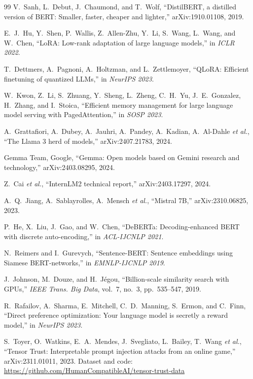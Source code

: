 \documentclass[conference]{IEEEtran}
\begin{document}
\begin{thebibliography}{99}
 V.~Sanh, L.~Debut, J.~Chaumond, and T.~Wolf, ``DistilBERT, a distilled version of BERT: Smaller, faster, cheaper and lighter,'' arXiv:1910.01108, 2019.

 E.~J.~Hu, Y.~Shen, P.~Wallis, Z.~Allen-Zhu, Y.~Li, S.~Wang, L.~Wang, and W.~Chen, ``LoRA: Low-rank adaptation of large language models,'' in \textit{ICLR 2022}.

 T.~Dettmers, A.~Pagnoni, A.~Holtzman, and L.~Zettlemoyer, ``QLoRA: Efficient finetuning of quantized LLMs,'' in \textit{NeurIPS 2023}.

 W.~Kwon, Z.~Li, S.~Zhuang, Y.~Sheng, L.~Zheng, C.~H.~Yu, J.~E.~Gonzalez, H.~Zhang, and I.~Stoica, ``Efficient memory management for large language model serving with PagedAttention,'' in \textit{SOSP 2023}.

 A.~Grattafiori, A.~Dubey, A.~Jauhri, A.~Pandey, A.~Kadian, A.~Al-Dahle \textit{et al.}, ``The Llama 3 herd of models,'' arXiv:2407.21783, 2024.

 Gemma Team, Google, ``Gemma: Open models based on Gemini research and technology,'' arXiv:2403.08295, 2024.

 Z.~Cai \textit{et al.}, ``InternLM2 technical report,'' arXiv:2403.17297, 2024.

 A.~Q.~Jiang, A.~Sablayrolles, A.~Mensch \textit{et al.}, ``Mistral 7B,'' arXiv:2310.06825, 2023.

 P.~He, X.~Liu, J.~Gao, and W.~Chen, ``DeBERTa: Decoding-enhanced BERT with discrete auto-encoding,'' in \textit{ACL-IJCNLP 2021}.

 N.~Reimers and I.~Gurevych, ``Sentence-BERT: Sentence embeddings using Siamese BERT-networks,'' in \textit{EMNLP-IJCNLP 2019}.

 J.~Johnson, M.~Douze, and H.~J\'egou, ``Billion-scale similarity search with GPUs,'' \textit{IEEE Trans. Big Data}, vol.~7, no.~3, pp.~535--547, 2019.

 R.~Rafailov, A.~Sharma, E.~Mitchell, C.~D.~Manning, S.~Ermon, and C.~Finn, ``Direct preference optimization: Your language model is secretly a reward model,'' in \textit{NeurIPS 2023}.

 S.~Toyer, O.~Watkins, E.~A.~Mendes, J.~Svegliato, L.~Bailey, T.~Wang \textit{et al.}, ``Tensor Trust: Interpretable prompt injection attacks from an online game,'' arXiv:2311.01011, 2023. Dataset and code: \url{https://github.com/HumanCompatibleAI/tensor-trust-data}

\end{thebibliography}
\end{document}

